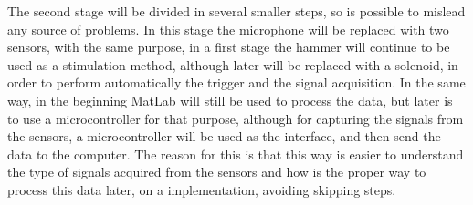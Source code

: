 The second stage will be divided in several smaller steps, so is possible to mislead any source of problems. In this stage the microphone will be replaced with two sensors, with the same purpose, in a first stage the hammer will continue to be used as a stimulation method, although later will be replaced with a solenoid, in order to perform automatically the trigger and the signal acquisition. In the same way, in the beginning MatLab will still be used to process the data, but later is to use a microcontroller for that purpose, although for capturing the signals from the sensors, a microcontroller will be used as the interface, and then send the data to the computer. The reason for this is that this way is easier to understand the type of signals acquired from the sensors and how is the proper way to process this data later, on a implementation, avoiding skipping steps.

\clearpage
